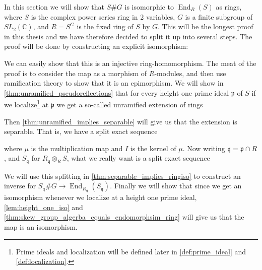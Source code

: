 \documentclass[11pt, a4paper, english]{article}
\theoremstyle{definition}
\newcommand{\C}{\mathbb{C}}
\DeclareMathOperator{\End}{End}
\begin{document}
In this section we will show that $S\#G$ is isomorphic to $\End_R(S)$ as rings, where $S$ is the complex power series ring in 2 variables, $G$ is a finite subgroup of $SL_2(\C)$, and $R = S^G$ is the fixed ring of $S$ by $G$. This will be the longest proof in this thesis and we have therefore decided to split it up into several steps. The proof will be done by constructing an explicit isomorphism:
\begin{center}
\end{center}
We can easily show that this is an injective ring-homomorphism. The meat of the proof is to consider the map as a morphism of $R$-modules, and then use ramification theory to show that it is an epimorphism. We will show in \cref{thm:unramified_pseudoreflections} that for every height one prime ideal $\mathfrak{p}$ of $S$ if we localize\footnote{Prime ideals and localization will be defined later in \cref{def:prime_ideal} and \cref{def:localization}.} at $\mathfrak{p}$ we get a so-called unramified extension of rings
\begin{center}
\end{center}
Then \cref{thm:unramified_implies_separable} will give us that the extension is separable. That is, we have a split exact sequence
\begin{center}
\end{center}
where $\mu$ is the multiplication map and $I$ is the kernel of $\mu$. Now writing $\mathfrak{q} = \mathfrak{p} \cap R$, and $S_\mathfrak{q}$ for $R_\mathfrak{q} \otimes_R S$, what we really want is a split exact sequence
\begin{center}
\end{center}
We will use this splitting in \cref{thm:separable_implies_ringiso} to construct an inverse for $S_\mathfrak{q}\#G \to \End_{R_{\mathfrak{q}}}(S_\mathfrak{q})$. Finally we will show that since we get an isomorphism whenever we localize at a height one prime ideal, \cref{lem:height_one_iso} and \cref{thm:skew_group_algerba_equals_endomorphsim_ring} will give us that the map is an isomorphism.
\end{document}
